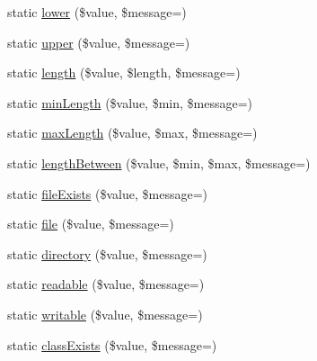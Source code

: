 \begin{DoxyCompactItemize}
\item 
static \mbox{\hyperlink{class_webmozart_1_1_assert_1_1_assert_a8969d580c2578af08315d16ce71eb7e0}{lower}} (\$value, \$message=\textquotesingle{}\textquotesingle{})
\item 
static \mbox{\hyperlink{class_webmozart_1_1_assert_1_1_assert_a3d60055ed19ba357158715e8bab7adb6}{upper}} (\$value, \$message=\textquotesingle{}\textquotesingle{})
\item 
static \mbox{\hyperlink{class_webmozart_1_1_assert_1_1_assert_addf2819486be529a76c0dec2ce715fb5}{length}} (\$value, \$length, \$message=\textquotesingle{}\textquotesingle{})
\item 
static \mbox{\hyperlink{class_webmozart_1_1_assert_1_1_assert_a076e2a10e10ca51d2c4fa0dbbea6f047}{min\+Length}} (\$value, \$min, \$message=\textquotesingle{}\textquotesingle{})
\item 
static \mbox{\hyperlink{class_webmozart_1_1_assert_1_1_assert_a29e9b8eb7a3b8263acd0e8b8f4fd1bdd}{max\+Length}} (\$value, \$max, \$message=\textquotesingle{}\textquotesingle{})
\item 
static \mbox{\hyperlink{class_webmozart_1_1_assert_1_1_assert_a115bd29ad02595481fb40ad61ac9f857}{length\+Between}} (\$value, \$min, \$max, \$message=\textquotesingle{}\textquotesingle{})
\item 
static \mbox{\hyperlink{class_webmozart_1_1_assert_1_1_assert_a36bb9216c7741e2609ec97037d97a2f4}{file\+Exists}} (\$value, \$message=\textquotesingle{}\textquotesingle{})
\item 
static \mbox{\hyperlink{class_webmozart_1_1_assert_1_1_assert_a1fbdb9a57ff87ee84b27076fb134737e}{file}} (\$value, \$message=\textquotesingle{}\textquotesingle{})
\item 
static \mbox{\hyperlink{class_webmozart_1_1_assert_1_1_assert_a7c2e997b2a48bc556e8c8841eb049198}{directory}} (\$value, \$message=\textquotesingle{}\textquotesingle{})
\item 
static \mbox{\hyperlink{class_webmozart_1_1_assert_1_1_assert_a00fbf58e98ff47aacd1a07f5ba733e7d}{readable}} (\$value, \$message=\textquotesingle{}\textquotesingle{})
\item 
static \mbox{\hyperlink{class_webmozart_1_1_assert_1_1_assert_afee3979636d28e1abd0629067c26ed1d}{writable}} (\$value, \$message=\textquotesingle{}\textquotesingle{})
\item 
static \mbox{\hyperlink{class_webmozart_1_1_assert_1_1_assert_af1c5e45aace30e8134053ac8334c5de6}{class\+Exists}} (\$value, \$message=\textquotesingle{}\textquotesingle{})

\end{DoxyCompactItemize}
